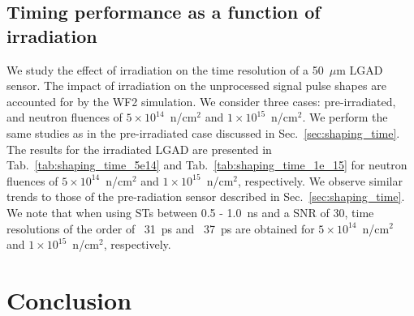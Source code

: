 \documentclass[preprint,1p]{elsarticle}
\begin{document}
\subsection{Timing performance as a function of irradiation}\label{sec:rad_tolerance}
We study the effect of irradiation on the time resolution of a 50~$\mu$m LGAD sensor. The impact of irradiation on the unprocessed
signal pulse shapes are accounted for by the WF2 simulation. We consider three cases: pre-irradiated, and neutron fluences of
$5\times 10^{14}$~n/cm$^2$ and $1\times 10^{15}$~n/cm$^2$. We perform the same studies as in the pre-irradiated case discussed in
Sec.~\ref{sec:shaping_time}. The results for the irradiated LGAD are presented in Tab.~\ref{tab:shaping_time_5e14} and
Tab.~\ref{tab:shaping_time_1e_15} for neutron fluences of
$5\times 10^{14}$~n/cm$^2$ and $1\times 10^{15}$~n/cm$^2$, respectively.
We observe similar trends to those of the pre-radiation sensor described in
Sec.~\ref{sec:shaping_time}. We note that when using STs between 0.5 - 1.0~\si{ns} and a SNR of 30, time resolutions of the order
of ~31~\si{ps} and ~37~\si{ps} are obtained for $5\times 10^{14}$~n/cm$^2$ and $1\times 10^{15}$~n/cm$^2$, respectively.

\section{Conclusion}\label{sec:conclusion}
\end{document}
